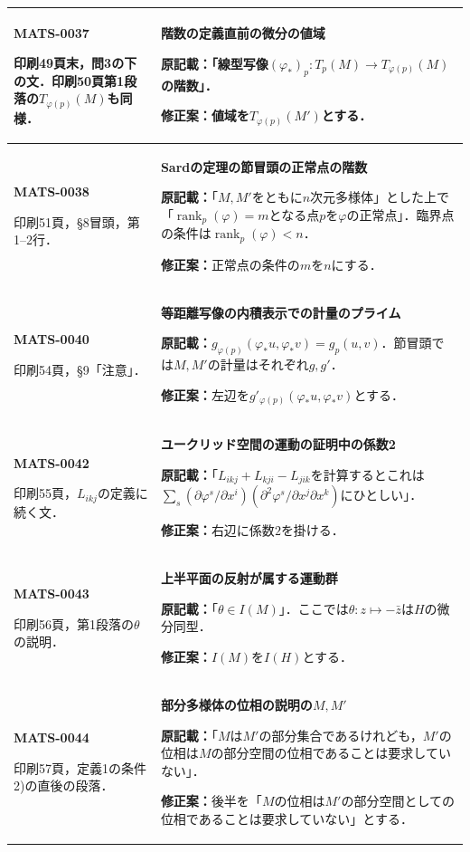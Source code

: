 \documentclass[a4paper,10pt]{ltjsarticle}
\begin{document}
\begin{longtable}{@{}>{\raggedright\arraybackslash}p{.19\linewidth}>{\raggedright\arraybackslash}p{.77\linewidth}@{}}
\hline
\hypertarget{MATS-0037}{}\textbf{MATS-0037}\par 印刷49頁末，問3の下の文．印刷50頁第1段落の$T_{\varphi(p)}(M)$も同様． & \textbf{階数の定義直前の微分の値域}\par\textbf{原記載：}「線型写像$(\varphi_*)_p:T_p(M)\to T_{\varphi(p)}(M)$の階数」．\par\textbf{修正案：}値域を$T_{\varphi(p)}(M')$とする． \\[3pt]
\hline
\hypertarget{MATS-0038}{}\textbf{MATS-0038}\par 印刷51頁，\S8冒頭，第1--2行． & \textbf{Sardの定理の節冒頭の正常点の階数}\par\textbf{原記載：}「$M,M'$をともに$n$次元多様体」とした上で「$\operatorname{rank}_p(\varphi)=m$となる点$p$を$\varphi$の正常点」．臨界点の条件は$\operatorname{rank}_p(\varphi)<n$．\par\textbf{修正案：}正常点の条件の$m$を$n$にする． \\[3pt]
\hline
\hypertarget{MATS-0040}{}\textbf{MATS-0040}\par 印刷54頁，\S9「注意」． & \textbf{等距離写像の内積表示での計量のプライム}\par\textbf{原記載：}$g_{\varphi(p)}(\varphi_*u,\varphi_*v)=g_p(u,v)$．節冒頭では$M,M'$の計量はそれぞれ$g,g'$．\par\textbf{修正案：}左辺を$g'_{\varphi(p)}(\varphi_*u,\varphi_*v)$とする． \\[3pt]
\hline
\hypertarget{MATS-0042}{}\textbf{MATS-0042}\par 印刷55頁，$L_{ikj}$の定義に続く文． & \textbf{ユークリッド空間の運動の証明中の係数2}\par\textbf{原記載：}「$L_{ikj}+L_{kji}-L_{jik}$を計算するとこれは$\sum_s(\partial\varphi^s/\partial x^i)(\partial^2\varphi^s/\partial x^j\partial x^k)$にひとしい」．\par\textbf{修正案：}右辺に係数$2$を掛ける． \\[3pt]
\hline
\hypertarget{MATS-0043}{}\textbf{MATS-0043}\par 印刷56頁，第1段落の$\theta$の説明． & \textbf{上半平面の反射が属する運動群}\par\textbf{原記載：}「$\theta\in I(M)$」．ここでは$\theta:z\mapsto-\bar z$は$H$の微分同型．\par\textbf{修正案：}$I(M)$を$I(H)$とする． \\[3pt]
\hline
\hypertarget{MATS-0044}{}\textbf{MATS-0044}\par 印刷57頁，定義1の条件2)の直後の段落． & \textbf{部分多様体の位相の説明の$M,M'$}\par\textbf{原記載：}「$M$は$M'$の部分集合であるけれども，$M'$の位相は$M$の部分空間の位相であることは要求していない」．\par\textbf{修正案：}後半を「$M$の位相は$M'$の部分空間としての位相であることは要求していない」とする． \\[3pt]

\end{longtable}
\end{document}
